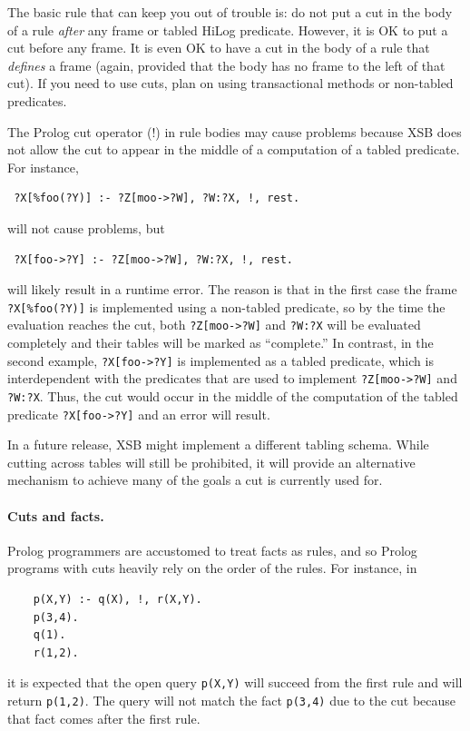 \documentclass[11pt]{article}
\begin{document}
The basic rule that can keep you out of trouble is: do not put a cut in the
body of a rule \emph{after} any frame or tabled  HiLog
predicate. However, it is OK to put a cut before any frame. It is
even OK to have a cut in the body of a rule that \emph{defines} a
frame (again, provided that the body has no frame to the left of
that cut). If you need to use cuts, plan on using transactional methods or
non-tabled predicates.

The Prolog cut operator (!) in rule bodies may cause problems because
XSB does not allow the cut to appear in the middle of a computation of a
tabled predicate. For instance,
\begin{verbatim}
 ?X[%foo(?Y)] :- ?Z[moo->?W], ?W:?X, !, rest.  
\end{verbatim}
will not cause problems, but
\begin{verbatim}
 ?X[foo->?Y] :- ?Z[moo->?W], ?W:?X, !, rest.  
\end{verbatim}
will likely result in a runtime error. The reason is that in the first case
the frame \verb|?X[%foo(?Y)]| is implemented using a non-tabled predicate, so
by the time the evaluation reaches the cut, both \verb|?Z[moo->?W]| and 
{\tt ?W:?X} will be evaluated completely and their tables will be marked as
``complete.'' In contrast, in the second example, \verb|?X[foo->?Y]| is
implemented as a tabled predicate, which is interdependent with the
predicates that are used to implement \verb|?Z[moo->?W]| and 
{\tt ?W:?X}. Thus, the cut would occur in the middle of the computation of
the tabled predicate \verb|?X[foo->?Y]| and an error will result.

In a future release, XSB might implement a different tabling schema. While
cutting across tables will still be prohibited, it will provide an
alternative mechanism to achieve many of the goals a cut is currently
used for.

\paragraph{Cuts and facts.}
Prolog programmers are accustomed
to treat facts as rules, and so Prolog programs
with cuts heavily rely on the order of the rules. For instance, in
\begin{verbatim}
    p(X,Y) :- q(X), !, r(X,Y).
    p(3,4).
    q(1).
    r(1,2).
\end{verbatim}
it is expected that the open query \texttt{p(X,Y)} will succeed from the
first rule and will return \texttt{p(1,2)}. The query will not match  
the fact \texttt{p(3,4)} due to the cut because that fact comes after the
first rule.
\end{document}
